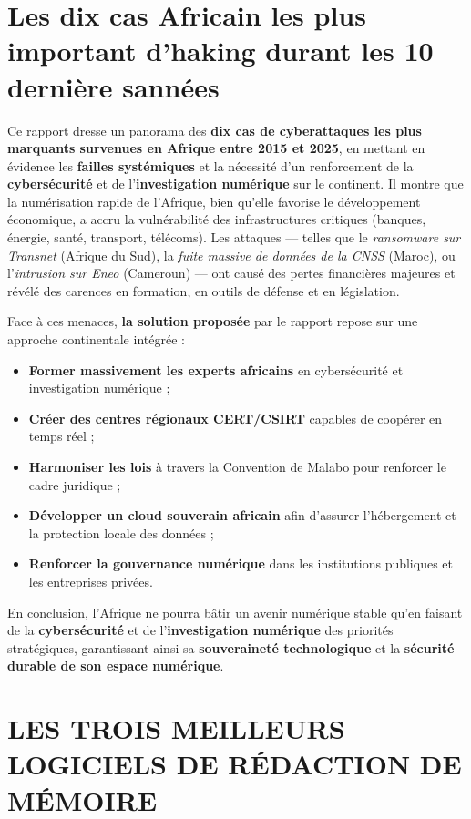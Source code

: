 \documentclass[memoire, 12pt]{report}
\begin{document}
\section{Les dix cas Africain les plus important d'haking durant les 10 dernière sannées }

Ce rapport dresse un panorama des \textbf{dix cas de cyberattaques les plus marquants survenues en Afrique entre 2015 et 2025}, en mettant en évidence les \textbf{failles systémiques} et la nécessité d’un renforcement de la \textbf{cybersécurité} et de l’\textbf{investigation numérique} sur le continent. Il montre que la numérisation rapide de l’Afrique, bien qu’elle favorise le développement économique, a accru la vulnérabilité des infrastructures critiques (banques, énergie, santé, transport, télécoms). Les attaques — telles que le \textit{ransomware sur Transnet} (Afrique du Sud), la \textit{fuite massive de données de la CNSS} (Maroc), ou l’\textit{intrusion sur Eneo} (Cameroun) — ont causé des pertes financières majeures et révélé des carences en formation, en outils de défense et en législation.

Face à ces menaces, \textbf{la solution proposée} par le rapport repose sur une approche continentale intégrée :
\begin{itemize}
    \item \textbf{Former massivement les experts africains} en cybersécurité et investigation numérique ;
    \item \textbf{Créer des centres régionaux CERT/CSIRT} capables de coopérer en temps réel ;
    \item \textbf{Harmoniser les lois} à travers la Convention de Malabo pour renforcer le cadre juridique ;
    \item \textbf{Développer un cloud souverain africain} afin d’assurer l’hébergement et la protection locale des données ;
    \item \textbf{Renforcer la gouvernance numérique} dans les institutions publiques et les entreprises privées.
\end{itemize}

En conclusion, l’Afrique ne pourra bâtir un avenir numérique stable qu’en faisant de la \textbf{cybersécurité} et de l’\textbf{investigation numérique} des priorités stratégiques, garantissant ainsi sa \textbf{souveraineté technologique} et la \textbf{sécurité durable de son espace numérique}.


\section{ LES TROIS MEILLEURS LOGICIELS DE
RÉDACTION DE MÉMOIRE}
\end{document}
